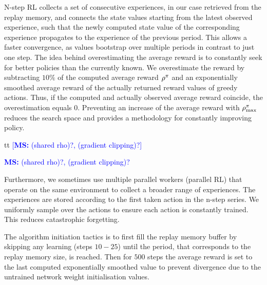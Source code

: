 \documentclass[envcountsame]{llncs}
\newcommand\MS[2][r]{\ifx t#1 \textcolor{blue}{[\textbf{MS:} #2]}
  \else \begin{center}\textcolor{blue}{\textbf{MS:} #2} \end{center} \fi}
\begin{document}
N-step RL collects a set of consecutive experiences, in our case retrieved from the replay memory,
and connects the state values starting from the latest observed experience, such that the newly
computed state value of the corresponding experience propagates to the experience of the previous
period. This allows a faster convergence, as values bootstrap over multiple periods in contrast to
just one step.
The idea behind overestimating the average reward is to constantly seek for better policies than the
currently known. We overestimate the reward by subtracting \(10\%\) of the computed average reward
\(\rho^{\pi}\) and an exponentially smoothed average reward of the actually returned reward
values of greedy actions. Thus, if the computed and actually observed average reward coincide, the
overestimation equals \(0\).
Preventing an increase of the average reward with \(\rho_{\max}^{\pi}\) reduces the search space
and provides a methodology for constantly improving policy.

\MS[t]{(shared rho)?, (gradient clipping)?}

Furthermore, we sometimes use multiple parallel workers (parallel RL) that operate on the same
environment to collect a broader range of experiences. The experiences are stored according to the
first taken action in the n-step series. We uniformly sample over the actions to ensure each action
is constantly trained. This reduces catastrophic forgetting.

The algorithm initiation tactics is to first fill the replay memory buffer by skipping any learning
(steps \(10-25\)) until the period, that corresponds to the replay memory size, is reached. Then
for \(500\) steps the average reward is set to the last computed exponentially smoothed value to
prevent divergence due to the untrained network weight initialisation values.


\end{document}
